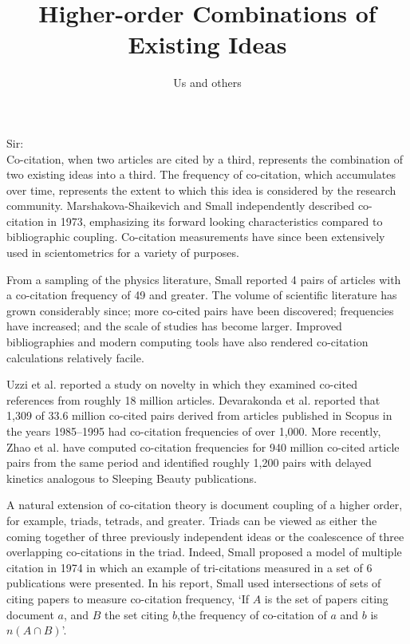 \documentclass[notitlepage]{report}
\title{Higher-order Combinations of Existing Ideas}
\author{Us and others}
\date{}
\begin{document}
\maketitle
\thispagestyle{empty}
Sir:\\

Co-citation, when two articles are cited by a third, represents the combination of two existing ideas into a third. The frequency of co-citation, which accumulates over time, represents the extent to which this idea is considered by the research community. Marshakova-Shaikevich and Small independently described co-citation in 1973, emphasizing its forward looking characteristics compared to bibliographic coupling.  Co-citation measurements have since been extensively used in scientometrics for a variety of purposes.

From a sampling of the physics literature, Small reported 4 pairs of articles with a co-citation frequency of 49 and greater. The volume of scientific literature has grown considerably since; more co-cited pairs have been discovered; frequencies have increased; and the scale of studies has become larger. Improved bibliographies and modern computing tools have also rendered co-citation calculations relatively facile. 

Uzzi et al. reported a study on novelty in which they examined co-cited references from roughly 18 million articles. Devarakonda et al. reported that 1,309 of 33.6 million co-cited pairs derived from articles published in Scopus in the years 1985--1995 had co-citation frequencies of over 1,000. More recently, Zhao et al. have computed co-citation frequencies for 940 million co-cited article pairs from the same period and identified roughly 1,200 pairs with delayed kinetics analogous to Sleeping Beauty publications. 

A natural extension of co-citation theory is document coupling of a higher order, for example, triads, tetrads, and greater. Triads can be viewed as either the coming together of three previously independent ideas or the coalescence of three overlapping co-citations in the triad. Indeed, Small proposed a model of multiple citation in 1974 in which an example of tri-citations measured in a set of 6 publications were presented. In his report, Small used intersections of sets of citing papers to measure co-citation frequency, `If $A$ is the set of papers citing document $a$, and $B$ the set citing $b$,the frequency of co-citation of $a$ and $b$ is $n(A \cap B)$'.
\end{document}
